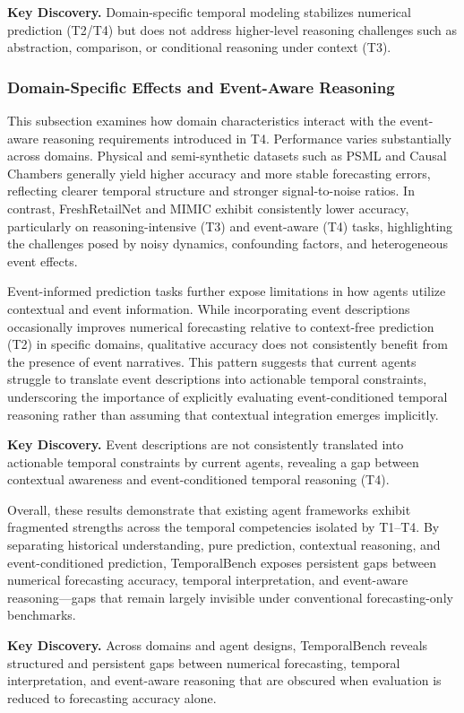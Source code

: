 \begin{keydiscovery1}
\textbf{Key Discovery.}
Domain-specific temporal modeling stabilizes numerical prediction (T2/T4) but does not address higher-level reasoning challenges such as abstraction, comparison, or conditional reasoning under context (T3).
\end{keydiscovery1}

\subsubsection{Domain-Specific Effects and Event-Aware Reasoning}
This subsection examines how domain characteristics interact with the event-aware reasoning requirements introduced in T4. Performance varies substantially across domains. Physical and semi-synthetic datasets such as PSML and Causal Chambers generally yield higher accuracy and more stable forecasting errors, reflecting clearer temporal structure and stronger signal-to-noise ratios. In contrast, FreshRetailNet and MIMIC exhibit consistently lower accuracy, particularly on reasoning-intensive (T3) and event-aware (T4) tasks, highlighting the challenges posed by noisy dynamics, confounding factors, and heterogeneous event effects.

Event-informed prediction tasks further expose limitations in how agents utilize contextual and event information. While incorporating event descriptions occasionally improves numerical forecasting relative to context-free prediction (T2) in specific domains, qualitative accuracy does not consistently benefit from the presence of event narratives. This pattern suggests that current agents struggle to translate event descriptions into actionable temporal constraints, underscoring the importance of explicitly evaluating event-conditioned temporal reasoning rather than assuming that contextual integration emerges implicitly.

\begin{keydiscovery1}
\textbf{Key Discovery.}
Event descriptions are not consistently translated into actionable temporal constraints by current agents, revealing a gap between contextual awareness and event-conditioned temporal reasoning (T4).
\end{keydiscovery1}

Overall, these results demonstrate that existing agent frameworks exhibit fragmented strengths across the temporal competencies isolated by T1--T4. By separating historical understanding, pure prediction, contextual reasoning, and event-conditioned prediction, TemporalBench exposes persistent gaps between numerical forecasting accuracy, temporal interpretation, and event-aware reasoning—gaps that remain largely invisible under conventional forecasting-only benchmarks.

\begin{keydiscovery1}
\textbf{Key Discovery.}
Across domains and agent designs, TemporalBench reveals structured and persistent gaps between numerical forecasting, temporal interpretation, and event-aware reasoning that are obscured when evaluation is reduced to forecasting accuracy alone.
\end{keydiscovery1}

